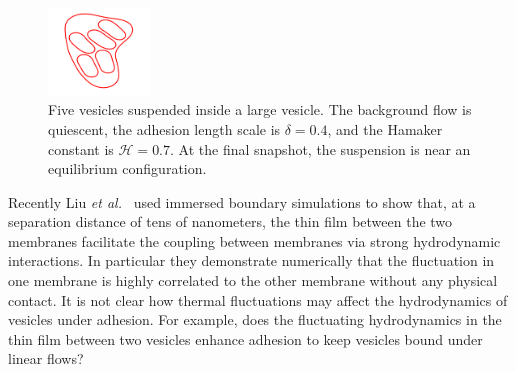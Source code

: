 \documentclass[prf,superscriptaddress,showpacs]{revtex4-1}
\begin{document}
\begin{figure}[htp]
  \includegraphics[width=0.24\textwidth]{figs/relaxationManyVes_Snapshot08.pdf}
  \caption{\label{fig:relaxationManyVes} Five vesicles suspended inside
  a large vesicle.  The background flow is quiescent, the adhesion
  length scale is $\delta = 0.4$, and the Hamaker constant is
  $\mathcal{H} = 0.7$.  At the final snapshot, the suspension is near an
  equilibrium configuration.}
\end{figure}

Recently Liu {\em et al.}~\cite{LiuChuNewbyRead2018_bioRxiv} used
immersed boundary simulations to show that, at a separation distance of
tens of nanometers, the thin film between the two membranes facilitate
the coupling between membranes via strong hydrodynamic interactions. In
particular they demonstrate numerically that the fluctuation in one
membrane is highly correlated to the other membrane without any physical
contact. It is not clear how thermal fluctuations may affect the
hydrodynamics of vesicles under adhesion. For example, does the
fluctuating hydrodynamics in the thin film between two vesicles enhance
adhesion to keep vesicles bound under linear flows?
\end{document}
